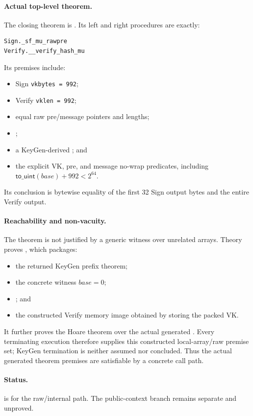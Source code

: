 \paragraph{Actual top-level theorem.}
The closing theorem is
. Its left and right
procedures are exactly:
\begin{verbatim}
Sign._sf_mu_rawpre
Verify.__verify_hash_mu
\end{verbatim}
Its premises include:
\begin{itemize}
  \item Sign \texttt{vkbytes = 992};
  \item Verify \texttt{vklen = 992};
  \item equal raw pre/message pointers and lengths;
  \item {};
  \item a KeyGen-derived ; and
  \item the explicit VK, pre, and message no-wrap predicates, including
        \(\mathsf{to\_uint}(base)+992<2^{64}\).
\end{itemize}
Its conclusion is bytewise equality of the first 32 Sign output bytes and the
entire Verify output.

\paragraph{Reachability and non-vacuity.}
The theorem is not justified by a generic witness over unrelated arrays.
Theory  proves
, which
packages:
\begin{itemize}
  \item the returned KeyGen prefix theorem;
  \item the concrete witness \(base = 0\);
  \item {}; and
  \item the constructed Verify memory image obtained by storing the packed VK.
\end{itemize}
It further proves the Hoare theorem
over the actual generated
. Every terminating
execution therefore supplies this constructed local-array/raw premise set;
KeyGen termination is neither assumed nor concluded. Thus the actual
generated theorem premises are satisfiable by a concrete call path.

\paragraph{Status.}
 is  for the raw/internal path.
The public-context branch remains separate and unproved.
